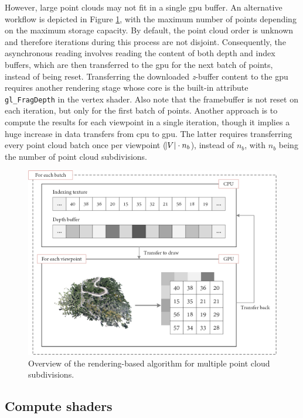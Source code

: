 However, large point clouds may not fit in a single \acrshort{gpu} buffer. An alternative workflow is depicted in Figure \ref{fig:occlusion_opengl_zbuffer_multiple_batches}, with the maximum number of points depending on the maximum storage capacity. By default, the point cloud order is unknown and therefore iterations during this process are not disjoint. Consequently, the asynchronous reading involves reading the content of both depth and index buffers, which are then transferred to the \acrshort{gpu} for the next batch of points, instead of being reset. Transferring the downloaded \textit{z}-buffer content to the \acrshort{gpu} requires another rendering stage whose core is the built-in attribute \verb|gl_FragDepth| in the vertex shader. Also note that the framebuffer is not reset on each iteration, but only for the first batch of points. Another approach is to compute the results for each viewpoint in a single iteration, though it implies a huge increase in data transfers from \acrshort{cpu} to \acrshort{gpu}. The latter requires transferring every point cloud batch once per viewpoint ($\abs{V} \cdot n_{b}$), instead of $n_{b}$, with $n_{b}$ being the number of point cloud subdivisions.

\begin{figure}[htb]
    \centering
    \includegraphics[width=.9\linewidth]{figs/multi_thermal_projection/multiple_batches_opengl_gpu.png}
    \caption{Overview of the rendering-based algorithm for multiple point cloud subdivisions.}
    \label{fig:occlusion_opengl_zbuffer_multiple_batches}
\end{figure}

\subsection{Compute shaders}

